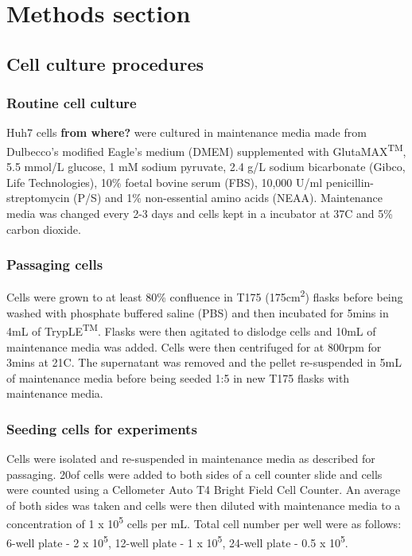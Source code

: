 \chapter{\label{ch:2-Methods section}Methods section}

\minitoc

\section{Cell culture procedures}

\subsection{Routine cell culture}

Huh7 cells \textbf{from where?} were cultured in maintenance media made from Dulbecco's modified Eagle's medium (DMEM) supplemented with GlutaMAX\textsuperscript{TM}, 5.5 mmol/L glucose, 1 mM sodium pyruvate, 2.4 g/L sodium bicarbonate (Gibco, Life Technologies), 10\% foetal bovine serum (FBS), 10,000 U/ml penicillin-streptomycin (P/S) and 1\% non-essential amino acids (NEAA). Maintenance media was changed every 2-3 days and cells kept in a incubator at 37\textdegree C and 5\% carbon dioxide. 

\subsection{Passaging cells}

Cells were grown to at least 80\% confluence in T175 (175cm\textsuperscript{2}) flasks before being washed with phosphate buffered saline (PBS) and then incubated for 5mins in 4mL of TrypLE\textsuperscript{TM}. Flasks were then agitated to dislodge cells and 10mL of maintenance media was added. Cells were then centrifuged for at 800rpm for 3mins at 21\textdegree C. The supernatant was removed and the pellet re-suspended in 5mL of maintenance media before being seeded 1:5 in new T175 flasks with maintenance media.

\subsection{Seeding cells for experiments}

Cells were isolated and re-suspended in maintenance media as described for passaging. 20\uL of cells were added to both sides of a cell counter slide and cells were counted using a Cellometer Auto T4 Bright Field Cell Counter. An average of both sides was taken and cells were then diluted with maintenance media to a concentration of 1 x 10\textsuperscript{5} cells per mL. Total cell number per well were as follows: 6-well plate - 2 x 10\textsuperscript{5}, 12-well plate - 1 x 10\textsuperscript{5}, 24-well plate - 0.5 x 10\textsuperscript{5}.

